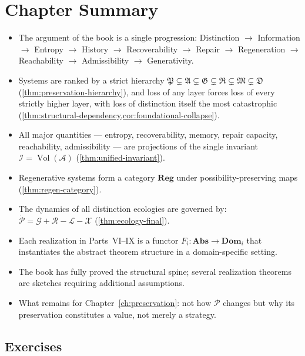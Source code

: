 \documentclass[12pt,twoside,openright]{book}
\newcommand{\adm}{\mathcal{A}}
\newcommand{\Vol}{\operatorname{Vol}}
\newenvironment{chapsummary}{%
  \begin{tcolorbox}[colback=DistBlue!5,colframe=DistBlue,
    title={\faBookOpen\enspace Summary},
    fonttitle=\sffamily\bfseries\color{white},
    attach boxed title to top left={yshift=-2mm,xshift=4mm},
    boxed title style={colback=DistBlue,rounded corners}]
  \begin{itemize}[nosep,leftmargin=*]}{%
  \end{itemize}\end{tcolorbox}}
\begin{document}
\section*{Chapter Summary}
\begin{chapsummary}
  \item The argument of the book is a single progression:
        Distinction $\to$ Information $\to$ Entropy
        $\to$ History $\to$ Recoverability $\to$ Repair
        $\to$ Regeneration $\to$ Reachability
        $\to$ Admissibility $\to$ Generativity.
  \item Systems are ranked by a strict hierarchy
        $\mathfrak{P} \subsetneq \mathfrak{A}
        \subsetneq \mathfrak{G} \subsetneq \mathfrak{R}
        \subsetneq \mathfrak{M} \subsetneq \mathfrak{D}$
        (\cref{thm:preservation-hierarchy}), and loss of
        any layer forces loss of every strictly higher
        layer, with loss of distinction itself the most
        catastrophic (\cref{thm:structural-dependency,cor:foundational-collapse}).
  \item All major quantities — entropy, recoverability,
        memory, repair capacity, reachability, admissibility
        — are projections of the single invariant
        $\mathcal{I} = \Vol(\adm)$
        (\cref{thm:unified-invariant}).
  \item Regenerative systems form a category
        $\mathbf{Reg}$ under possibility-preserving maps
        (\cref{thm:regen-category}).
  \item The dynamics of all distinction ecologies are
        governed by:
        $\dot{\mathcal{P}} = \mathcal{G} + \mathcal{R}
        - \mathcal{L} - \mathcal{X}$
        (\cref{thm:ecology-final}).
  \item Each realization in Parts~VI--IX is a functor
        $F_i: \mathbf{Abs} \to \mathbf{Dom}_i$ that
        instantiates the abstract theorem structure
        in a domain-specific setting.
  \item The book has fully proved the structural spine;
        several realization theorems are sketches
        requiring additional assumptions.
  \item What remains for Chapter~\ref{ch:preservation}:
        not how $\mathcal{P}$ changes but why its
        preservation constitutes a value, not merely
        a strategy.
\end{chapsummary}

\subsection*{Exercises}
\end{document}
